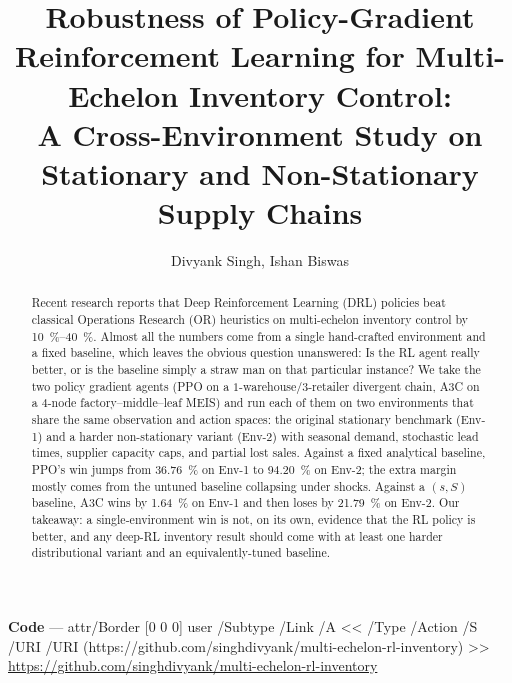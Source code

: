 \documentclass[letterpaper]{article} %
\title{Robustness of Policy-Gradient Reinforcement Learning for
       Multi-Echelon Inventory Control:\\
       A Cross-Environment Study on Stationary
       and Non-Stationary Supply Chains}
\author{
    Divyank Singh,
    Ishan Biswas
}
\begin{document}
\maketitle

\begin{abstract}
Recent research reports that Deep Reinforcement Learning (DRL) policies beat classical Operations Research (OR) heuristics on multi-echelon inventory control by \SIrange{10}{40}{\percent}. Almost all the numbers come from a single hand-crafted environment and a fixed baseline, which leaves the obvious question unanswered: Is the RL agent really better, or is the baseline simply a straw man on that particular instance? We take the two policy gradient agents (PPO on a $1$-warehouse/$3$-retailer divergent chain, A3C on a $4$-node factory--middle--leaf MEIS) and run each of them on two environments that share the same observation and action spaces: the original stationary benchmark (Env-1) and a harder non-stationary variant (Env-2) with seasonal demand, stochastic lead times, supplier capacity caps, and partial lost sales. Against a fixed analytical baseline, PPO's win jumps from \SI{36.76}{\percent} on Env-1 to \SI{94.20}{\percent} on Env-2; the extra margin mostly comes from the untuned baseline collapsing under shocks. Against a $(s,S)$ baseline, A3C wins by \SI{1.64}{\percent} on Env-1 and then loses by \SI{21.79}{\percent} on Env-2. Our takeaway: a single-environment win is not, on its own, evidence that the RL policy is better, and any deep-RL inventory result should come with at least one harder distributional variant and an equivalently-tuned baseline.
\end{abstract}

\begin{links}
  \par\textbf{Code} ---
  \pdfstartlink attr{/Border [0 0 0]} user{%
    /Subtype /Link /A << /Type /Action /S /URI
    /URI (https://github.com/singhdivyank/multi-echelon-rl-inventory) >>}%
  \url{https://github.com/singhdivyank/multi-echelon-rl-inventory}%
  \pdfendlink
\end{links}

\end{document}
